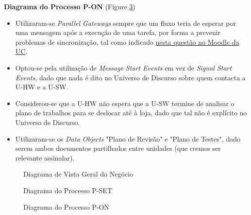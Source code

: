 \documentclass[12pt,a4paper]{article}
\begin{document}
\begin{tcolorbox}[enhanced jigsaw,colback=bg,boxrule=0pt,arc=4pt]
  \begin{small}
    \textbf{Diagrama do Processo P-ON} (Figure \ref{fig:p-on-bpmn})
  \end{small}
  \begin{itemize}
    \item Utilizaram-se \textit{Parallel Gateways} sempre que um fluxo teria de esperar por uma
          mensagem após a execução de uma tarefa, por forma a prevenir problemas de sincronização,
          tal como indicado \href{https://moodle.dei.tecnico.ulisboa.pt/mod/forum/discuss.php?d=7213}{nesta questão no Moodle da UC}.
    \item Optou-se pela utilização de \textit{Message Start Events} em vez de \textit{Signal Start Events}, dado que nada é dito
          no Universo de Discurso sobre quem contacta a U-HW e a U-SW.
    \item Considerou-se que a U-HW não espera que a U-SW termine de analisar o plano
          de trabalhos para se deslocar até à loja, dado que tal não é explícito no Universo de Discurso.
    \item Utilizaram-se os \textit{Data Objects} "Plano de Revisão" e "Plano de Testes",
          dado serem ambos documentos partilhados entre unidades (que cremos ser relevante assinalar).
  \end{itemize}
\end{tcolorbox}

\begin{landscape}
  \begin{figure}
    \centering
    
    \caption{Diagrama de Vista Geral do Negócio}
    \label{fig:archimate}
  \end{figure}
\end{landscape}

\begin{landscape}
  \begin{figure}
    \centering
    
    \caption{Diagrama do Processo P-SET}
    \label{fig:p-set-bpmn}
  \end{figure}
\end{landscape}

\begin{landscape}
  \begin{figure}
    \centering
    
    \caption{Diagrama do Processo P-ON}
    \label{fig:p-on-bpmn}
  \end{figure}
\end{landscape}
\end{document}

